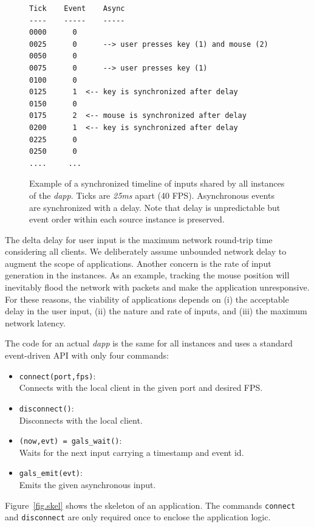 \documentclass[sigplan,screen]{acmart}
\begin{document}
\begin{figure}[t]
{\scriptsize
\begin{verbatim}
Tick    Event    Async
----    -----    -----
0000      0
0025      0      --> user presses key (1) and mouse (2)
0050      0
0075      0      --> user presses key (1)
0100      0
0125      1  <-- key is synchronized after delay
0150      0
0175      2  <-- mouse is synchronized after delay
0200      1  <-- key is synchronized after delay
0225      0
0250      0
....     ...
\end{verbatim}
}
  \caption{
    \label{fig.timeline}
    Example of a synchronized timeline of inputs shared by all instances of the
    \emph{dapp}.
    Ticks are \emph{25ms} apart (40 FPS).
    Asynchronous events are synchronized with a delay.
    Note that delay is unpredictable but event order within each source
    instance is preserved.
  }
\end{figure}

The delta delay for user input is the maximum network round-trip time
considering all clients.
We deliberately assume unbounded network delay to augment the scope of
applications.
Another concern is the rate of input generation in the instances.
As an example, tracking the mouse position will inevitably flood the network
with packets and make the application unresponsive.
For these reasons, the viability of applications depends on
    (i) the acceptable delay in the user input,
    (ii) the nature and rate of inputs, and
    (iii) the maximum network latency.

The code for an actual \emph{dapp} is the same for all instances and uses a
standard event-driven API with only four commands:
\begin{itemize}
\item \texttt{connect(port,fps)}:        \\Connects with the local client in the given port and desired FPS.
\item \texttt{disconnect()}:             \\Disconnects with the local client.
\item \texttt{(now,evt) = gals\_wait()}: \\Waits for the next input carrying a timestamp and event id.
\item \texttt{gals\_emit(evt)}:          \\Emits the given asynchronous input.
\end{itemize}
Figure~\ref{fig.skel} shows the skeleton of an application.
The commands \texttt{connect} and \texttt{disconnect} are only required once to
enclose the application logic.
\end{document}
